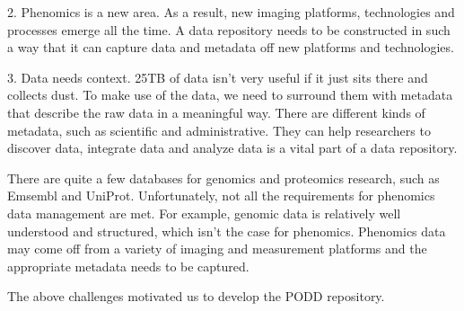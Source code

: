 \documentclass[ignorenonframetext,compress]{beamer}
\begin{document}
2. Phenomics is a new area. As a result, new imaging platforms,
technologies and processes emerge all the time. A data repository
needs to be constructed in such a way that it can capture data and
metadata off new platforms and technologies.

3. Data needs context. 25TB of data isn't very useful if it just 
sits there and collects dust. To make use of the data, we need to
surround them with metadata that describe the raw data in a 
meaningful way. There are different kinds of metadata, such as
scientific and administrative. They can help researchers to 
discover data, integrate data and analyze data is a vital part 
of a data repository.

There are quite a few databases for genomics and proteomics research,
such as Emsembl and UniProt. Unfortunately, not all the requirements
for phenomics data management are met. For example, genomic data is
relatively well understood and structured, which isn't the case for 
phenomics. Phenomics data may come off from a variety of imaging and 
measurement platforms and the appropriate metadata needs to be captured.

The above challenges motivated us to develop the PODD repository.
\end{document}
